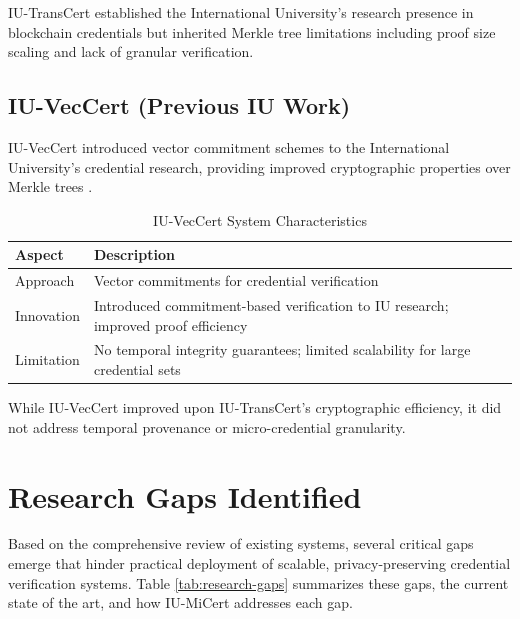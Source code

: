 IU-TransCert established the International University's research presence in blockchain credentials but inherited Merkle tree limitations including proof size scaling and lack of granular verification.

\subsection{IU-VecCert (Previous IU Work)}
\label{subsec:iuveccert}

IU-VecCert introduced vector commitment schemes to the International University's credential research, providing improved cryptographic properties over Merkle trees \cite{nguyen2024iuvec}.

\begin{table}[H]
\centering
\caption{IU-VecCert System Characteristics}
\label{tab:iuveccert}
\begin{tabular}{|p{3.5cm}|p{9.5cm}|}
\hline
\textbf{Aspect} & \textbf{Description} \\
\hline
Approach & Vector commitments for credential verification \\
\hline
Innovation & Introduced commitment-based verification to IU research; improved proof efficiency \\
\hline
Limitation & No temporal integrity guarantees; limited scalability for large credential sets \\
\hline
\end{tabular}
\end{table}

While IU-VecCert improved upon IU-TransCert's cryptographic efficiency, it did not address temporal provenance or micro-credential granularity.

\section{Research Gaps Identified}
Based on the comprehensive review of existing systems, several critical gaps emerge that hinder practical deployment of scalable, privacy-preserving credential verification systems. Table \ref{tab:research-gaps} summarizes these gaps, the current state of the art, and how IU-MiCert addresses each gap.

